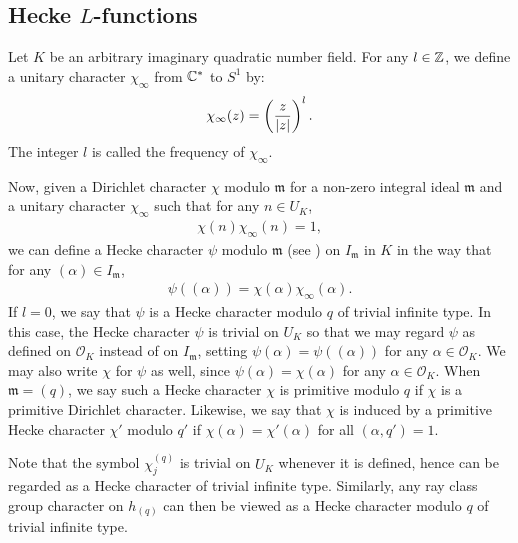 \documentclass[twoside,leqno,10pt, A4]{amsart}
\begin{document}
\subsection{Hecke $L$-functions}
\label{sect: Lfcn}

  Let $K$ be an arbitrary imaginary quadratic number field. For any $l \in \mathbb Z$, we define a unitary character
$\chi_{\infty}$ from $\mathbb C^*$ to $S^1$ by:
\begin{align*}
  \chi_{\infty}(z)=\left(\frac{z}{|z|}\right)^l.
\end{align*}
  The integer $l$ is called the frequency of $\chi_{\infty}$. \newline

  Now, given a Dirichlet character $\chi$ modulo $\mathfrak{m}$ for a non-zero integral ideal $\mathfrak{m}$ and a unitary character $\chi_{\infty}$ such that for any $n \in U_K$,
\begin{align*}
  \chi(n)\chi_{\infty}(n)=1,
\end{align*}
we can define a Hecke character $\psi$ modulo $\mathfrak{m}$ (see \cite[\S 6, Chap. VII]{Neukirch}) on $I_{\mathfrak{m}}$ in $K$ in the
way that for any $(\alpha) \in I_{\mathfrak{m}}$,
\begin{align*}
  \psi((\alpha))=\chi(\alpha)\chi_{\infty}(\alpha).
\end{align*}
If $l=0$, we say that $\psi$ is a Hecke character modulo $q$ of trivial infinite type. In this case, the Hecke character $\psi$ is trivial on
$U_K$ so that we may regard $\psi$ as defined on $\mathcal{O}_K$ instead of on $I_{\mathfrak{m}}$, setting $\psi(\alpha)=\psi((\alpha))$ for any $\alpha \in \mathcal{O}_K$. We may also write $\chi$ for $\psi$ as well, since $\psi(\alpha)=\chi(\alpha)$ for any $\alpha \in \mathcal{O}_K$. When $\mathfrak{m}=(q)$, we say such a Hecke character $\chi$ is primitive modulo $q$ if $\chi$ is a primitive Dirichlet character. Likewise, we say that  $\chi$
is induced by a primitive Hecke character $\chi'$ modulo $q'$ if $\chi(\alpha)=\chi'(\alpha)$ for all $(\alpha, q')=1$. \newline

 Note that the symbol $\chi^{(q)}_{j}$ is trivial on $U_K$ whenever it is defined, hence can be regarded as a Hecke character of trivial
infinite type. Similarly, any ray class group character on $h_{(q)}$ can then be viewed as a Hecke character modulo $q$ of trivial
infinite type. \newline
\end{document}
